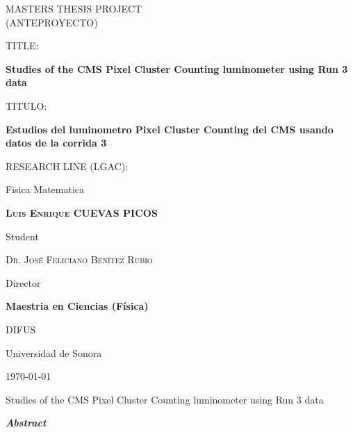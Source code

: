 \documentclass[final,12pt]{article}
\def\Student{Luis Enrique CUEVAS PICOS }
\def\Title{MASTERS THESIS PROJECT}
\def\TitleESP{(ANTEPROYECTO)}
\def\Prog{Maestria en Ciencias (F\'{i}sica) }
\def\Dept{DIFUS}
\def\Institution{Universidad de Sonora}
\def\Director{Dr. Jos\'{e} Feliciano Ben\'{i}tez Rubio}
\def\ProjectTitle{Studies of the CMS Pixel Cluster Counting luminometer using Run 3 data}
\def\ProjectTitleESP{Estudios del luminometro Pixel Cluster Counting del CMS usando datos de la corrida 3}
\def\ResearchLine{Fisica Matematica}
\begin{document}
\onehalfspacing

\begin{titlepage}
\centering
\hspace{0pt}
{\scshape\Large \Title \\ \TitleESP \par}
  
  \vspace{1cm}
  {
    TITLE:\par
    {\bf \large \ProjectTitle  \par}
       
    \vspace{0.4cm}
    TITULO:\par
    {\bf \large \ProjectTitleESP \par}
  }
       
  \vspace{1cm}
  {
    RESEARCH LINE (LGAC): \par
    \ResearchLine \par
  }
        
  \vspace{2cm}
  {\underline{\hspace{8cm}}\par}
  {\bf \scshape \Student \par}
  {Student\par}

  \vspace{1cm}
  {\underline{\hspace{8cm}}\par}
  {\scshape \Director \par}
  {Director\par}

  \vspace{1cm}
  {\bf \Prog \par}
  {\Dept \par}
  {\Institution \par}

  \vspace{2cm}
  {\today}

\hspace{0pt}
\vfill

\end{titlepage}


\shipout\null


\newpage
\hspace{2pt}
\vfill

  \begin{center}
    {\Large \ProjectTitle \par}
    \vspace{1cm}
    {\itshape\textbf{Abstract}\par}
  \end{center}
  
\end{document}
